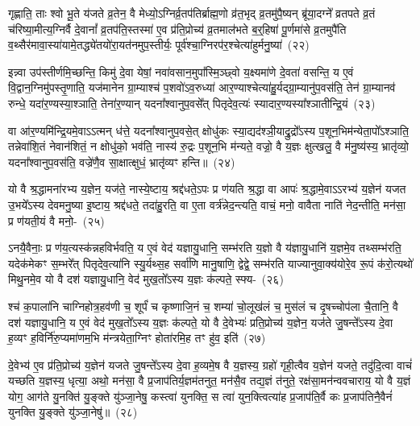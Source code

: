 गृह्णाति॒ ताः श्वो भू॒ते य॑जते व्र॒तेन॒ वै मेध्यो॒\-ऽग्निर्व्र॒तप॑तिर्ब्राह्म॒णो व्र॑त॒भृद् व्र॒तमु॑पै॒ष्यन् ब्रू॑या॒दग्ने᳚ व्रतपते व्र॒तं च॑रिष्या॒मीत्य॒ग्निर्वै दे॒वानां᳚ व्र॒तप॑ति॒स्तस्मा॑ ए॒व प्र॑ति॒प्रोच्य॑ व्र॒तमाल॑भते ब॒र्॒\mbox{}हिषा॑ पू॒र्णमा॑से व्र॒तमुपै॑ति व॒थ्सैर॑मा\-वा॒स्या॑यामे॒तद्ध्ये॑तयो॑\-रा॒यत॑न\-मुप॒स्तीर्यः॒ पूर्व॑श्चा॒ग्निरप॑र॒\-श्चेत्या॑हुर्मनु॒ष्या॑~(२२)

इन्न्वा उप॑स्तीर्णमि॒च्छन्ति॒ किमु॑ दे॒वा येषां॒ नवा॑वसान॒\-मुपा᳚स्मि॒ञ्छ्वो य॒क्ष्यमा॑णे दे॒वता॑ वसन्ति॒ य ए॒वं वि॒द्वान॒ग्निमु॑पस्तृ॒णाति॒ यज॑मानेन ग्रा॒म्याश्च॑ प॒शवो॑\-ऽव॒रुध्या॑ आर॒ण्याश्चेत्या॑\-हु॒र्यद्ग्रा॒म्यानु॑प॒\-वस॑ति॒ तेन॑ ग्रा॒म्यानव॑ रुन्धे॒ यदा॑र॒ण्यस्या॒श्ञाति॒ तेना॑र॒ण्यान् यदना᳚श्वानुप॒वसे᳚त् पितृदेव॒त्यः॑ स्यादा\-र॒ण्यस्या᳚श्ञातीन्द्रि॒यं~(२३)

वा आ॑र॒ण्यमि॑न्द्रि॒यमे॒वा\-ऽऽ\-त्मन् ध॑त्ते॒ यदना᳚श्वानुप॒वसे॒त् क्षोधु॑कः स्या॒द्यद॑श्ञी॒याद्रु॒द्रो᳚\-ऽस्य प॒शून॒भिम॑न्येता॒पो᳚\-ऽश्ञाति॒ तन्नेवा॑शि॒तं नेवान॑शितं॒ न क्षोधु॑को॒ भव॑ति॒ नास्य॑ रु॒द्रः प॒शून॒भि म॑न्यते॒ वज्रो॒ वै य॒ज्ञः क्षुत्खलु॒ वै म॑नु॒ष्य॑स्य॒ भ्रातृ॑व्यो॒ यदना᳚श्वानुप॒वस॑ति॒ वज्रे॑णै॒व सा॒क्षात्क्षुधं॒ भ्रातृ॑व्यꣳ हन्ति॥~(२४)

{\anuvakamend[{परि॑ मनु॒ष्या॑ इन्द्रि॒यꣳ सा॒क्षात् त्रीणि॑ च}]}%

यो वै श्र॒द्धामना॑रभ्य य॒ज्ञेन॒ यज॑ते॒ नास्ये॒ष्टाय॒ श्रद्द॑धते॒\-ऽपः प्र ण॑यति श्र॒द्धा वा आपः॑ श्र॒द्धामे॒वा\-ऽऽ\-रभ्य॑ य॒ज्ञेन॑ यजत उ॒भये᳚\-ऽस्य देवमनु॒ष्या इ॒ष्टाय॒ श्रद्द॑धते॒ तदा॑हु॒रति॒ वा ए॒ता वर्त्र॑न्नेद॒न्त्यति॒ वाचं॒ मनो॒ वावैता नाति॑ नेद॒न्तीति॒ मन॑सा॒ प्र ण॑यती॒यं वै मनो॒-~(२५)

ऽनयै॒वैनाः॒ प्र ण॑य॒त्यस्क॑न्नहविर्भवति॒ य ए॒वं वेद॑ यज्ञायु॒धानि॒ सम्भ॑रति य॒ज्ञो वै य॑ज्ञायु॒धानि॑ य॒ज्ञमे॒व तथ्सम्भ॑रति॒ यदेक॑मेकꣳ स॒म्भरे᳚त् पितृदेव॒त्या॑नि स्यु॒र्यथ्स॒ह सर्वा॑णि मानु॒षाणि॒ द्वेद्वे॒ सम्भ॑रति याज्यानुवा॒क्य॑योरे॒व रू॒पं क॑रो॒त्यथो॑ मिथु॒नमे॒व यो वै दश॑ यज्ञायु॒धानि॒ वेद॑ मुख॒तो᳚\-ऽस्य य॒ज्ञः क॑ल्पते॒ स्फ्य-~(२६)

श्च॑ क॒पाला॑नि चाग्निहोत्र॒हव॑णी च॒ शूर्पं॑ च कृष्णाजि॒नं च॒ शम्या॑ चो॒लूख॑लं च॒ मुस॑लं च दृ॒षच्चोप॑ला चै॒तानि॒ वै दश॑ यज्ञायु॒धानि॒ य ए॒वं वेद॑ मुख॒तो᳚\-ऽस्य य॒ज्ञः क॑ल्पते॒ यो वै दे॒वेभ्यः॑ प्रति॒प्रोच्य॑ य॒ज्ञेन॒ यज॑ते जु॒षन्ते᳚\-ऽस्य दे॒वा ह॒व्यꣳ ह॒विर्नि॑रु॒प्यमा॑णम॒भि म॑न्त्रयेता॒ग्निꣳ होता॑रमि॒ह तꣳ हु॑व॒ इति॑~(२७)

दे॒वेभ्य॑ ए॒व प्र॑ति॒प्रोच्य॑ य॒ज्ञेन॑ यजते जु॒षन्ते᳚\-ऽस्य दे॒वा ह॒व्यमे॒ष वै य॒ज्ञस्य॒ ग्रहो॑ गृही॒त्वैव य॒ज्ञेन॑ यजते॒ तदु॑दि॒त्वा वाचं॑ यच्छति य॒ज्ञस्य॒ धृत्या॒ अथो॒ मन॑सा॒ वै प्र॒जा\-प॑तिर्य॒ज्ञम॑तनुत॒ मन॑सै॒व तद्य॒ज्ञं त॑नुते॒ रक्ष॑सा॒मन॑न्ववचाराय॒ यो वै य॒ज्ञं योग॒ आग॑ते यु॒नक्ति॑ यु॒ङ्क्ते यु॑ञ्जा॒नेषु॒ कस्त्वा॑ युनक्ति॒ स त्वा॑ युन॒क्त्वित्या॑ह प्र॒जा\-प॑ति॒र्वै कः प्र॒जा\-प॑तिनै॒वैनं॑ युनक्ति यु॒ङ्क्ते यु॑ञ्जा॒नेषु॑॥~(२८)

